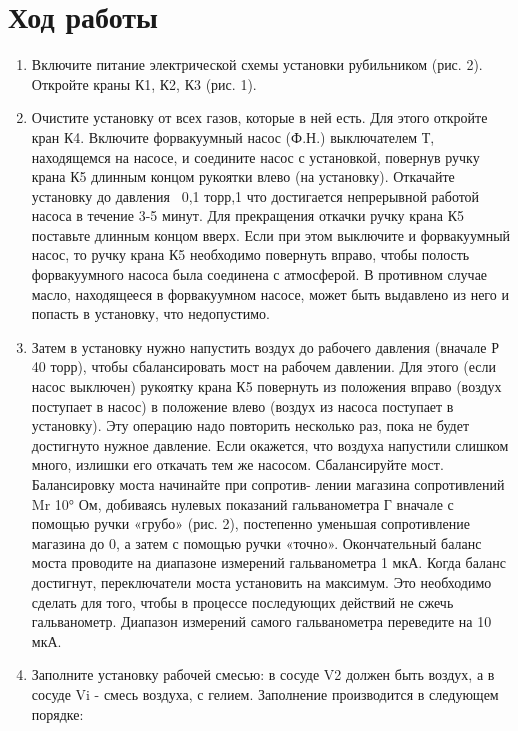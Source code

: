 \documentclass[12pt]{article}
\begin{document}
\section{Ход работы}
    \begin{enumerate}
        \item Включите питание электрической схемы установки рубильником (рис. 2). Откройте краны К1, К2, К3 (рис. 1).
        \item Очистите установку от всех газов, которые в ней есть. Для этого откройте кран К4. Включите форвакуумный насос (Ф.Н.) 
        выключателем Т, находящемся на насосе, и соедините насос с установкой, повернув ручку крана К5 длинным концом рукоятки влево 
        (на установку). Откачайте установку до давления ~0,1 торр,1 что достигается непрерывной работой насоса в течение 3-5 минут. 
        Для прекращения откачки ручку крана К5 поставьте длинным концом вверх. Если при этом выключите и форвакуумный насос, 
        то ручку крана К5 необходимо повернуть вправо, чтобы полость форвакуумного насоса была соединена с атмосферой. 
        В противном случае масло, находящееся в форвакуумном насосе, может быть выдавлено из него и попасть в установку, 
        что недопустимо.
        \item Затем в установку нужно напустить воздух до рабочего давления (вначале Р 40 торр), чтобы сбалансировать мост на 
        рабочем давлении. Для этого (если насос выключен) рукоятку крана К5 повернуть из положения вправо (воздух поступает в насос) 
        в положение влево (воздух из насоса поступает в установку). Эту операцию надо повторить несколько раз, пока не будет 
        достигнуто нужное давление. Если окажется, что воздуха напустили слишком много, излишки его откачать тем же насосом. 
        Сбалансируйте мост. Балансировку моста начинайте при сопротив-
        лении магазина сопротивлений Mr 10° Ом, добиваясь нулевых показаний гальванометра Г вначале с помощью ручки «грубо» 
        (рис. 2), постепенно уменьшая сопротивление магазина до 0, а затем с помощью ручки «точно». Окончательный баланс моста 
        проводите на диапазоне измерений гальванометра 1 мкА. Когда баланс достигнут, переключатели моста установить на максимум. 
        Это необходимо сделать для того, чтобы в процессе последующих действий не сжечь гальванометр. Диапазон измерений 
        самого гальванометра переведите на 10 мкА.
        \item Заполните установку рабочей смесью: в сосуде V2 должен быть воздух, а в сосуде Vi - смесь воздуха, с гелием. 
        Заполнение производится в следующем порядке:

\end{enumerate}
\end{document}

